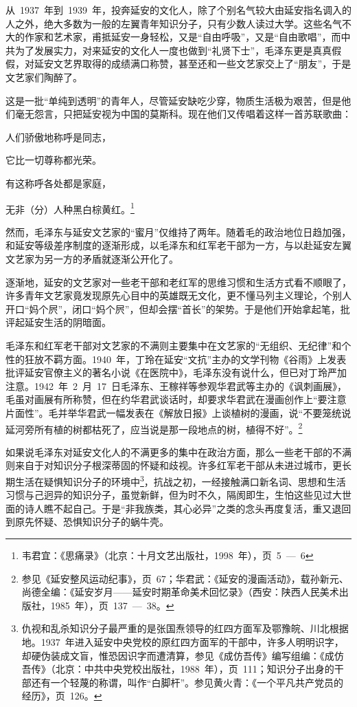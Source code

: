 从~1937~年到~1939~年，投奔延安的文化人，除了个别名气较大由延安指名调入的人之外，绝大多数为一般的左翼青年知识分子，只有少数人读过大学。这些名气不大的作家和艺术家，甫抵延安一身轻松，又是“自由呼吸”，又是“自由歌唱”，而中共为了发展实力，对来延安的文化人一度也做到“礼贤下士”，毛泽东更是真真假假，对延安文艺界取得的成绩满口称赞，甚至还和一些文艺家交上了“朋友”，于是文艺家们陶醉了。

这是一批“单纯到透明”的青年人，尽管延安缺吃少穿，物质生活极为艰苦，但是他们毫无怨言，只把延安视为中国的莫斯科。现在他们又传唱着这样一首苏联歌曲：

\begin{quoting}
人们骄傲地称呼是同志，

它比一切尊称都光荣。

有这称呼各处都是家庭，

无非（分）人种黑白棕黄红。\footnote{韦君宜：《思痛录》（北京：十月文艺出版社，1998~年），页~5~—~6}
\end{quoting}

然而，毛泽东与延安文艺家的“蜜月”仅维持了两年。随着毛的政治地位日趋加强，和延安等级差序制度的逐渐形成，以毛泽东和红军老干部为一方，与以赴延安左翼文艺家为另一方的矛盾就逐渐公开化了。

逐渐地，延安的文艺家对一些老干部和老红军的思维习惯和生活方式看不顺眼了，许多青年文艺家竟发现原先心目中的英雄既无文化，更不懂马列主义理论，个别人开口“妈个屄”，闭口“妈个屄”，但却会摆“首长”的架势。于是他们开始拿起笔，批评起延安生活的阴暗面。

毛泽东和红军老干部对文艺家的不满则主要集中在文艺家的“无组织、无纪律”和个性的狂放不羁方面。1940~年，丁玲在延安“文抗”主办的文学刊物《谷雨》上发表批评延安官僚主义的著名小说《在医院中》，毛泽东没有说什么，但已对丁玲严加注意。1942~年~2~月~17~日毛泽东、王稼祥等参观华君武等主办的《讽刺画展》，毛虽对画展有所称赞，但在约华君武谈话时，却要求华君武在漫画创作上“要注意片面性”。毛并举华君武一幅发表在《解放日报》上谈植树的漫画，说“不要笼统说延河旁所有植的树都枯死了，应当说是那一段地点的树，植得不好”。\footnote{参见《延安整风运动纪事》，页~67；华君武：《延安的漫画活动》，载孙新元、尚德全编：《延安岁月——延安时期革命美术回忆录》（西安：陕西人民美术出版社，1985~年），页~137~—~38。}

如果说毛泽东对延安文化人的不满更多的集中在政治方面，那么一些老干部的不满则来自于对知识分子根深蒂固的怀疑和歧视。许多红军老干部从未进过城市，更长期生活在疑惧知识分子的环境中\footnote{仇视和乱杀知识分子最严重的是张国焘领导的红四方面军及鄂豫皖、川北根据地。1937~年进入延安中央党校的原红四方面军的干部中，许多人明明识字，却硬伪装成文盲，惟恐因识字而遭清算，参见《成仿吾传》编写组编：《成仿吾传》（北京：中共中央党校出版社，1988~年），页~111；知识分子出身的干部还有一个轻蔑的称谓，叫作“白脚杆”。参见黄火青：《一个平凡共产党员的经历》，页~126。}，抗战之初，一经接触满口新名词、思想和生活习惯与己迥异的知识分子，虽觉新鲜，但为时不久，隔阂即生，生怕这些见过大世面的诗人瞧不起自己。于是“非我族类，其心必异”之类的念头再度复活，重又退回到原先怀疑、恐惧知识分子的蜗牛壳。

